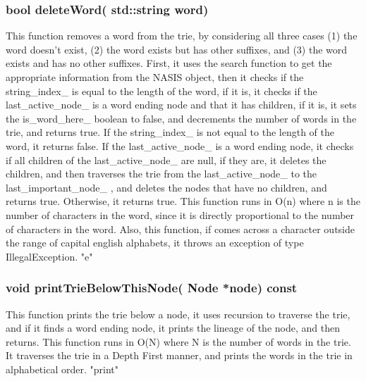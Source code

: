 \subsubsection{{\color{orange}bool} {\color{draculapurple}deleteWord}({\color{orange} std::string} word)}
This function removes a word from the trie, by considering all three cases (1) the word doesn't exist, (2) the word exists but has other suffixes, and (3) the word exists and has no other suffixes. 
First, it uses the {\color{draculapurple}search} function to get the appropriate information from the NASIS object, then it checks if the {\color{draculapurple}string\_index\_} 
is equal to the length of the word, if it is, it checks if the {\color{draculapurple}last\_active\_node\_} is a word ending node and that it has children, 
if it is, it sets the {\color{draculapurple}is\_word\_here\_} boolean to false, and decrements the number of words in the trie, and returns true. If the {\color{draculapurple}string\_index\_} 
is not equal to the length of the word, it returns false. If the {\color{draculapurple}last\_active\_node\_} is a word ending node, it checks if all children of the 
{\color{draculapurple}last\_active\_node\_} are null, if they are, it deletes the children, and then traverses the trie from the {\color{draculapurple}last\_active\_node\_} 
to the {\color{draculapurple}last\_important\_node\_}  , and deletes the nodes that have no children, and returns true. Otherwise, it returns true. This function runs in 
{\color{lightblue}O(n)} where {\color{lightblue}n} is the number of characters in the word, since it is directly proportional to the number of characters in the word.
Also, this function, if comes across a character outside the range of capital english alphabets, it throws an exception of type {\color{orange}IllegalException}.
{\color{GoldenYellow}"e"}




\subsubsection{{\color{orange}void} {\color{draculapurple}printTrieBelowThisNode}({\color{orange} Node} *node) {\color{GoldenYellow} const}}
This function prints the trie below a node, it uses recursion to traverse the trie, and if it finds a word ending node, it prints the lineage of the node, and then returns. This function runs in {\color{lightblue}O(N)} where {\color{lightblue}N} is the number of words in the trie.
It traverses the trie in a Depth First manner, and prints the words in the trie in alphabetical order.
{\color{GoldenYellow}"print"}



